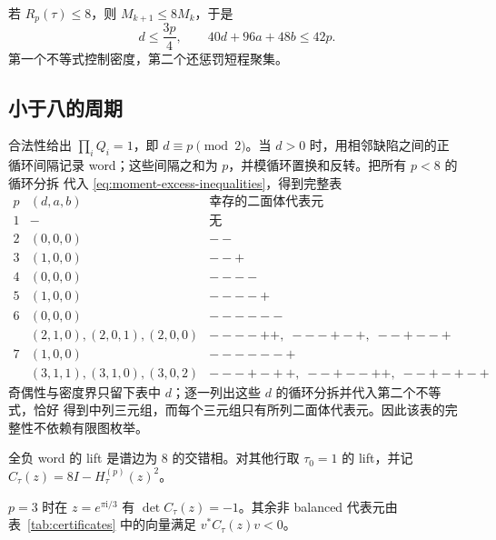 若 $R_p(\tau)\leq8$，则 $M_{k+1}\leq8M_k$，于是
\begin{equation}
 d\leq\frac{3p}{4},\qquad 40d+96a+48b\leq42p.
 \label{eq:moment-excess-inequalities}
\end{equation}
第一个不等式控制密度，第二个还惩罚短程聚集。

\subsection{小于八的周期}

合法性给出 $\prod_iQ_i=1$，即 $d\equiv p\pmod2$。当 $d>0$ 时，用相邻缺陷之间的正
循环间隔记录 word；这些间隔之和为 $p$，并模循环置换和反转。把所有 $p<8$ 的循环分拆
代入 \eqref{eq:moment-excess-inequalities}，得到完整表
\begin{equation}
\begin{array}{c|c|l}
p&(d,a,b)&\text{幸存的二面体代表元}\\ \hline
1&-&\text{无}\\ 2&(0,0,0)&--\\ 3&(1,0,0)&--+\\
4&(0,0,0)&----\\ 5&(1,0,0)&----+\\
6&(0,0,0)&------\\
 &(2,1,0),(2,0,1),(2,0,0)&----++,\;---+-+,\;--+--+\\
7&(1,0,0)&------+\\
 &(3,1,1),(3,1,0),(3,0,2)&---+-++,\;--+--++,\;--+-+-+
\end{array}
\label{eq:short-survivors}
\end{equation}
奇偶性与密度界只留下表中 $d$；逐一列出这些 $d$ 的循环分拆并代入第二个不等式，恰好
得到中列三元组，而每个三元组只有所列二面体代表元。因此该表的完整性不依赖有限图枚举。

全负 word 的 lift 是谱边为 $8$ 的交错相。对其他行取 $\tau_0=1$ 的 lift，并记
$C_\tau(z)=8I-H_\tau^{(p)}(z)^2$。

\begin{lemma}
\label{lem:short-certificates}
$p=3$ 时在 $z=e^{\pi\mathrm i/3}$ 有 $\det C_\tau(z)=-1$。其余非 balanced 代表元由
表~\ref{tab:certificates} 中的向量满足 $v^*C_\tau(z)v<0$。
\end{lemma}

